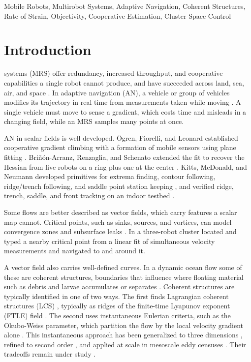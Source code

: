 \documentclass[lettersize,journal]{IEEEtran}
\begin{document}
\begin{IEEEkeywords}
Mobile Robots, Multirobot Systems, Adaptive Navigation, Coherent
Structures, Rate of Strain, Objectivity, Cooperative Estimation,
Cluster Space Control
\end{IEEEkeywords}

\section{Introduction}


 systems (MRS) offer redundancy, increased
throughput, and cooperative capabilities a single robot cannot produce, and have
succeeded across land, sea, air, and space \cite{1,2}. In adaptive
navigation (AN), a vehicle or group of vehicles modifies its trajectory in
real time from measurements taken while moving \cite{3}. A single vehicle
must move to sense a gradient, which costs time and misleads in a changing
field, while an MRS samples many points at once.


AN in scalar fields is well developed. \"{O}gren, Fiorelli, and Leonard
established cooperative gradient climbing with a formation of mobile
sensors using plane fitting \cite{4}. Bri\~{n}\'{o}n-Arranz, Renzaglia, and Schenato
extended the fit to recover the Hessian from five robots on a ring plus
one at the center \cite{5}. Kitts, McDonald, and
Neumann developed primitives for extrema finding, contour following,
ridge/trench following, and saddle point station keeping \cite{3}, and
verified ridge, trench, saddle, and front tracking on an indoor testbed
\cite{6,7}.

Some flows are better described as vector fields, which carry features a
scalar map cannot. Critical points, such as sinks, sources, and vortices,
can model convergence zones \cite{8} and subsurface leaks \cite{9}. In
\cite{10} a three-robot cluster located and typed a nearby critical point
from a linear fit of simultaneous velocity measurements and navigated to
and around it.

A vector field also carries well-defined curves. In a dynamic ocean flow some of these are coherent structures, boundaries that influence where floating material such as debris and larvae accumulates or separates \cite{11,12}.
Coherent structures are typically identified in one of two ways. The
first finds Lagrangian coherent structures (LCS) \cite{13}, typically as
ridges of the finite-time Lyapunov exponent (FTLE) field \cite{14}. The
second uses instantaneous Eulerian criteria, such as the Okubo-Weiss
parameter, which partition the flow by the local velocity gradient alone
\cite{8,15}. This instantaneous approach has been generalized to three
dimensions \cite{16}, refined to second order \cite{17}, and applied at
scale in mesoscale eddy censuses \cite{18}. Their tradeoffs remain under
study \cite{19,20,21,22}.
\end{document}
